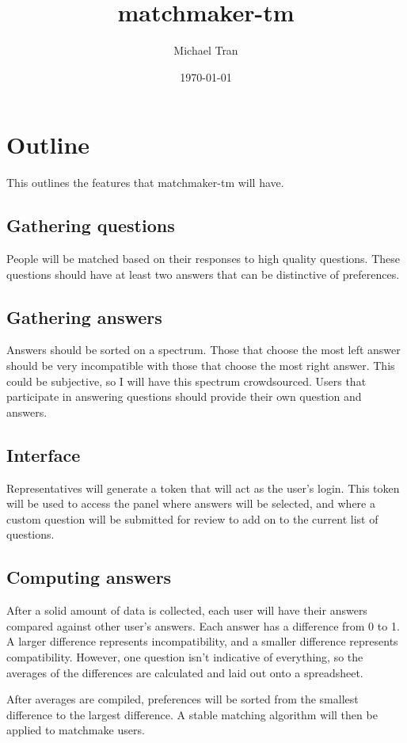 \documentclass[12pt]{article}
\title{matchmaker-tm}
\author{Michael Tran}
\date{\today}
\begin{document}
\maketitle

\section{Outline}

This outlines the features that matchmaker-tm will have.

\subsection{Gathering questions}
People will be matched based on their responses to high quality questions. These questions should have at least two answers that can be distinctive of preferences.

\subsection{Gathering answers}
Answers should be sorted on a spectrum. Those that choose the most left answer should be very incompatible with those that choose the most right answer. This could be subjective, so I will have this spectrum crowdsourced. Users that participate in answering questions should provide their own question and answers.

\subsection{Interface}
Representatives will generate a token that will act as the user's login. This token will be used to access the panel where answers will be selected, and where a custom question will be submitted for review to add on to the current list of questions.

\subsection{Computing answers}
After a solid amount of data is collected, each user will have their answers compared against other user's answers. Each answer has a difference from 0 to 1. A larger difference represents incompatibility, and a smaller difference represents compatibility. However, one question isn't indicative of everything, so the averages of the differences are calculated and laid out onto a spreadsheet.

After averages are compiled, preferences will be sorted from the smallest difference to the largest difference. A stable matching algorithm will then be applied to matchmake users.
\end{document}
